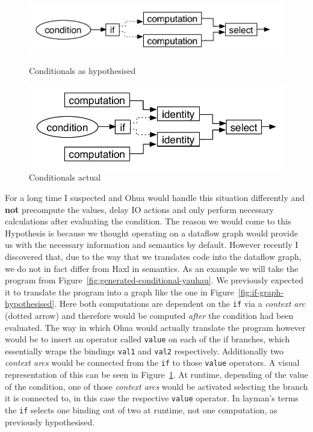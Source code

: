 \begin{figure}
  \includegraphics[width=\textwidth]{../Figures/if-hypothesised}
  \caption{Conditionals as hypothesised}
  \label{fig:if-graph-hypothesised}
  \includegraphics[width=\textwidth]{../Figures/if-in-reality}
  \caption{Conditionals actual}
  \label{fig:if-graph-actual}
\end{figure}

For a long time I suspected \yauhau{} and Ohua would handle this situation differently and \textbf{not} precompute the values, delay IO actions and only perform necessary calculations after evaluating the condition.
The reason we would come to this Hypothesis is because we thought operating on a dataflow graph would provide us with the necessary information and semantics by default.
However recently I discovered that, due to the way that we translates code into the dataflow graph, we do not in fact differ from Haxl in semantics.
As an example we will take the program from Figure~\ref{fig:generated-conditional-yauhau}.
We previously expected it to translate the program into a graph like the one in Figure~\ref{fig:if-graph-hypothesised}.
Here both computations are dependent on the \texttt{if} via a \textit{context arc} (dotted arrow) and therefore would be computed \textit{after} the condition had been evaluated.
The way in which Ohua would actually translate the program however would be to insert an operator called \texttt{value} on each of the if branches, which essentially wraps the bindings \texttt{val1} and \texttt{val2} respectively.
Additionally two \textit{context arcs} would be connected from the \texttt{if} to those \texttt{value} operators.
A visual representation of this can be seen in Figure~\ref{fig:if-graph-actual}.
At runtime, depending of the value of the condition, one of those \textit{context arcs} would be activated selecting the branch it is connected to, in this case the respective \texttt{value} operator.
In layman's terms the \texttt{if} selects one binding out of two at runtime, not one computation, as previously hypothesised.


